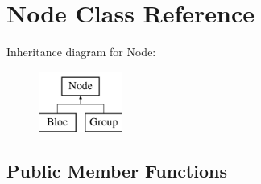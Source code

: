 \hypertarget{class_open_chams_1_1_node}{}\section{Node Class Reference}
\label{class_open_chams_1_1_node}
Inheritance diagram for Node\+:\begin{figure}[H]
\begin{center}
\leavevmode
\includegraphics[height=2.000000cm]{class_open_chams_1_1_node}
\end{center}
\end{figure}
\subsection*{Public Member Functions}
